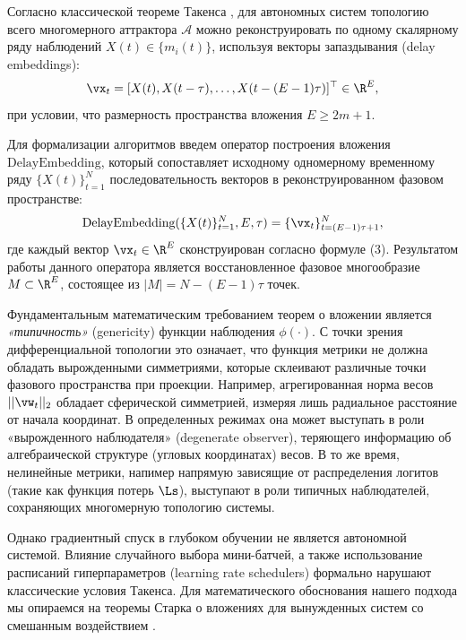 \documentclass{article}
\begin{document}
Согласно классической теореме Такенса \cite{takens1981detecting}, для автономных систем топологию всего многомерного аттрактора $\mathcal{A}$ можно реконструировать по одному скалярному ряду наблюдений $X(t) \in \{m_i(t)\}$, используя векторы запаздывания (delay embeddings):
\begin{equation}
    \vx_t =[X(t), X(t-\tau), \dots, X(t-(E-1)\tau)]^\top \in \R^E,
\end{equation}
при условии, что размерность пространства вложения $E \ge 2m + 1$.

Для формализации алгоритмов введем оператор построения вложения $\text{DelayEmbedding}$, который сопоставляет исходному одномерному временному ряду $\{X(t)\}_{t=1}^N$ последовательность векторов в реконструированном фазовом пространстве:
\begin{equation}
    \text{DelayEmbedding}(\{X(t)\}_{t=1}^N, E, \tau) = \{ \vx_t \}_{t=(E-1)\tau + 1}^{N},
\end{equation}
где каждый вектор $\vx_t \in \R^E$ сконструирован согласно формуле (3). Результатом работы данного оператора является восстановленное фазовое многообразие $M \subset \R^E$, состоящее из $|M| = N - (E-1)\tau$ точек.

Фундаментальным математическим требованием теорем о вложении является \textit{«типичность»} (genericity) функции наблюдения $\phi(\cdot)$. С точки зрения дифференциальной топологии это означает, что функция метрики не должна обладать вырожденными симметриями, которые склеивают различные точки фазового пространства при проекции. Например, агрегированная норма весов $||\vw_t||_2$ обладает сферической симметрией, измеряя лишь радиальное расстояние от начала координат. В определенных режимах она может выступать в роли «вырожденного наблюдателя» (degenerate observer), теряющего информацию об алгебраической структуре (угловых координатах) весов. В то же время, нелинейные метрики, напимер напрямую зависящие от распределения логитов (такие как функция потерь $\Ls$), выступают в роли типичных наблюдателей, сохраняющих многомерную топологию системы.

Однако градиентный спуск в глубоком обучении не является автономной системой. Влияние случайного выбора мини-батчей, а также использование расписаний гиперпараметров (learning rate schedulers) формально нарушают классические условия Такенса. Для математического обоснования нашего подхода мы опираемся на теоремы Старка о вложениях для вынужденных систем со смешанным воздействием \cite{stark1999delay, stark2003delay}. 
\end{document}
